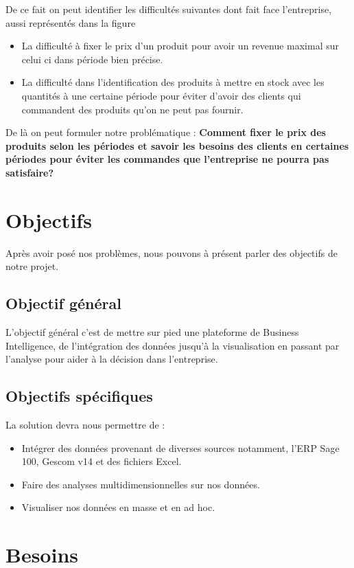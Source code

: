 De ce fait on peut identifier les difficultés  suivantes dont fait face l'entreprise, aussi représentés dans la figure 
\begin{itemize}
    \item La difficulté à fixer le prix d'un produit pour avoir un revenue maximal sur celui ci dans période bien précise.
    \item La difficulté dans l'identification des produits à mettre en stock avec les quantités à une certaine période pour éviter d'avoir des clients qui commandent des produits qu'on ne peut pas fournir.
\end{itemize}
De là on peut formuler notre problématique : \textbf{Comment fixer le prix des produits selon les périodes et savoir les besoins des clients en certaines périodes pour éviter les commandes que l'entreprise ne pourra pas satisfaire?}  



\section{Objectifs}
Après avoir posé nos problèmes, nous pouvons à présent parler des objectifs de notre projet.

\subsection{Objectif général}
L’objectif général c’est de mettre sur pied une plateforme de Business Intelligence, de l’intégration des données jusqu’à la visualisation en passant par l’analyse pour aider à la décision dans l'entreprise. 

\subsection{Objectifs spécifiques}
La solution devra nous permettre de :
\begin{itemize}
    \item Intégrer des données provenant de diverses sources notamment, l’ERP Sage 100, Gescom v14 et des fichiers Excel.
    \item Faire des analyses multidimensionnelles sur nos données.
    \item Visualiser nos données en masse et en ad hoc.
\end{itemize}


\section{Besoins}
